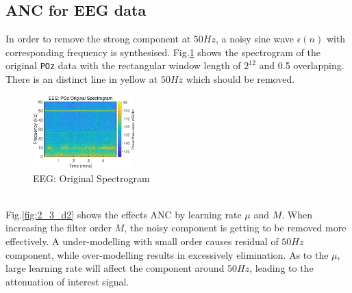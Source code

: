 \subsection{ANC for EEG data}
In order to remove the strong component at $50Hz$, a noisy sine wave $\epsilon(n)$ with corresponding frequency is synthesised. Fig.\ref{fig:2_3_d1} shows the spectrogram of the original \texttt{POz} data with the rectangular window length of $2^{12}$ and 0.5 overlapping. There is an distinct line in yellow at $50Hz$ which should be removed.
\begin{figure}[htb]
    \centering
    \includegraphics[width=0.35\textwidth]{fig/23/23d1.eps}
    \caption{EEG: Original Spectrogram}
    \label{fig:2_3_d1}
\end{figure}\\
Fig.\ref{fig:2_3_d2} shows the effects ANC by learning rate $\mu$ and $M$. When increasing the filter order $M$, the noisy component is getting to be removed more effectively. A under-modelling with small order causes residual of $50Hz$ component, while over-modelling results in excessively elimination. As to the $\mu$, large learning rate will affect the component around $50Hz$, leading to the attenuation of interest signal.
